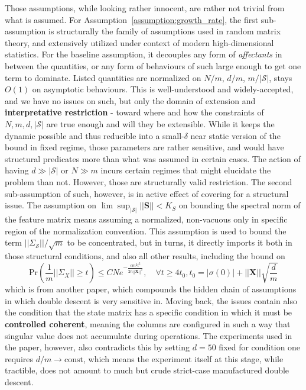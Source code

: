 Those assumptions, while looking rather innocent, are rather not trivial from what is assumed. For Assumption~\ref{assumption:growth_rate}, the first sub-assumption is structurally the family of assumptions used in random matrix theory, and extensively utilized under context of modern high-dimensional statistics. For the baseline assumption, it decouples any form of \textit{affectants} in between the quantities, or any form of behaviours of such large enough to get one term to dominate. Listed quantities are normalized on $N/m$, $d/m$, $m/|\mathcal{S}|$, stays $O(1)$ on asymptotic behaviours. This is well-understood and widely-accepted, and we have no issues on such, but only the domain of extension and \textbf{interpretative restriction} - toward where and how the constraints of $N,m,d,|\mathcal{S}|$ are true enough and will they be extensible. While it keeps the dynamic possible and thus reducible into a small-$\delta$ near static version of the bound in fixed regime, those parameters are rather sensitive, and would have structural predicates more than what was assumed in certain cases. The action of having $d\gg |\mathcal{S}|$ or $N\gg m$ incurs certain regimes that might elucidate the problem than not. However, those are structurally valid restriction. The second sub-assumption of such, however, is in active effect of covering for a structural issue. The assumption on $\lim \sup_{|\mathcal{S}|}||\bm{S}||<K_{S}$ on bounding the spectral norm of the feature matrix means assuming a normalized, non-vacuous only in specific region of the normalization convention. This assumption is used to bound the term $||\Sigma_{\mathcal{S}}||/\sqrt{m}$ to be concentrated, but in turns, it directly imports it both in those structural conditions, and also all other results, including the bound on 
\begin{equation}
    \mathrm{Pr}\left(\frac{1}{m}||\Sigma_{X}||\geq t\right) \leq CNe^{-\frac{cm^{2}t^{2}}{2n||\bm{X}||^{2}}}, \quad \forall t \geq 4 t_{0}, t_{0} = |\sigma(0)| + ||\bm{X}||\sqrt{\frac{d}{m}} 
\end{equation}
which is from another paper, which compounds the hidden chain of assumptions in which double descent is very sensitive in. Moving back, the issues contain also the condition that the state matrix has a specific condition in which it must be \textbf{controlled coherent}, meaning the columns are configured in such a way that singular value does not accumulate during operations. The experiments used in the paper, however, also contradicts this by setting $d=50$ fixed for condition one requires $d/m\to \mathrm{const}$, which means the experiment itself at this stage, while tractible, does not amount to much but crude strict-case manufactured double descent. 


